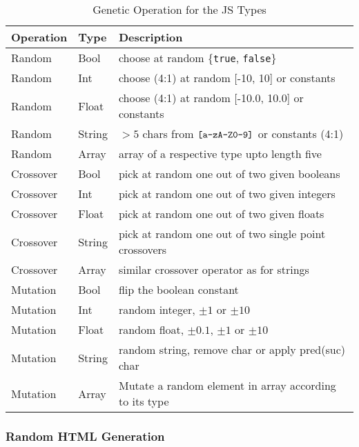 \begin{table}[!t]
  \caption{Genetic Operation for the JS Types}
  \label{tbl.gen.oper.js.types}
  \scriptsize
  \centering
  \begin{tabular}{p{1cm}|p{5mm}|p{6cm}}
    \toprule
    \textbf{Operation} & \textbf{Type} & \textbf{Description} \\
    \hline
    Random    & Bool   & choose at random \{\texttt{true}, \texttt{false}\} \\
    Random    & Int    & choose (4:1) at random [-10, 10] or constants\\
    Random    & Float  & choose (4:1) at random [-10.0, 10.0] or constants\\
    Random    & String & $>5$ chars from $\jsID{[a-zA-Z0-9]}$ or constants (4:1)\\
    Random    & Array  & array of a respective type upto length five\\
    \hline
    Crossover & Bool   & pick at random one out of two given booleans \\
    Crossover & Int    & pick at random one out of two given integers\\
    Crossover & Float  & pick at random one out of two given floats\\
    Crossover & String & pick at random one out of two single point crossovers\\
    Crossover & Array  & similar crossover operator as for strings\\
    \hline
    Mutation  & Bool   & flip the boolean constant\\
    Mutation  & Int    & random integer, $\pm 1$ or $\pm 10$\\
    Mutation  & Float  & random float, $\pm 0.1$, $\pm 1$ or $\pm 10$\\
    Mutation  & String & random string, remove char or apply pred(suc) char\\
    Mutation  & Array  & Mutate a random element in array according to its type\\
    \bottomrule
  \end{tabular}
\end{table}

\subsubsection{Random HTML Generation}
\label{sub.sub.sec.random.html}

